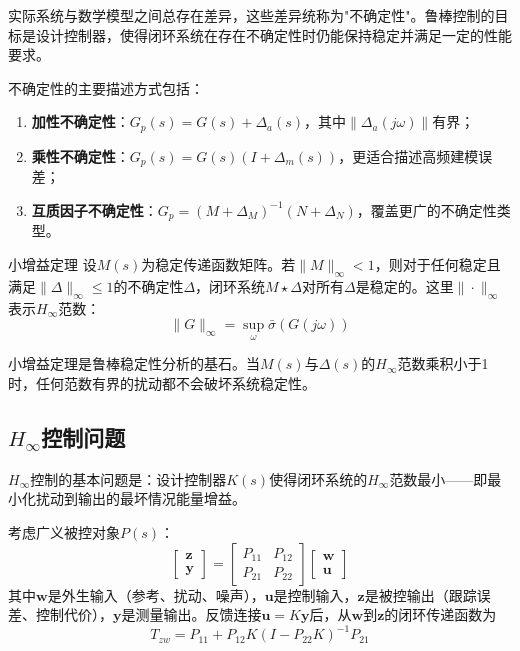 实际系统与数学模型之间总存在差异，这些差异统称为"不确定性"。鲁棒控制的目标是设计控制器，使得闭环系统在存在不确定性时仍能保持稳定并满足一定的性能要求。

不确定性的主要描述方式包括：
\begin{enumerate}
\item \textbf{加性不确定性}：\(G_p(s) = G(s) + \Delta_a(s)\)，其中\(\|\Delta_a(j\omega)\|\)有界；
\item \textbf{乘性不确定性}：\(G_p(s) = G(s)(I + \Delta_m(s))\)，更适合描述高频建模误差；
\item \textbf{互质因子不确定性}：\(G_p = (M + \Delta_M)^{-1}(N + \Delta_N)\)，覆盖更广的不确定性类型。
\end{enumerate}

\begin{mydefinition}{小增益定理}
设\(M(s)\)为稳定传递函数矩阵。若\(\|M\|_{\infty} < 1\)，则对于任何稳定且满足\(\|\Delta\|_{\infty} \le 1\)的不确定性\(\Delta\)，闭环系统\(M \star \Delta\)对所有\(\Delta\)是稳定的。这里\(\|\cdot\|_{\infty}\)表示\(H_{\infty}\)范数：
\[
\|G\|_{\infty} = \sup_{\omega} \bar{\sigma}(G(j\omega))
\]
\end{mydefinition}

小增益定理是鲁棒稳定性分析的基石。当\(M(s)\)与\(\Delta(s)\)的\(H_{\infty}\)范数乘积小于1时，任何范数有界的扰动都不会破坏系统稳定性。

\subsection{\(H_{\infty}\)控制问题}

\(H_{\infty}\)控制的基本问题是：设计控制器\(K(s)\)使得闭环系统的\(H_{\infty}\)范数最小——即最小化扰动到输出的最坏情况能量增益。

考虑广义被控对象\(P(s)\)：
\[
\begin{bmatrix} \mathbf{z} \\ \mathbf{y} \end{bmatrix} =
\begin{bmatrix} P_{11} & P_{12} \\ P_{21} & P_{22} \end{bmatrix}
\begin{bmatrix} \mathbf{w} \\ \mathbf{u} \end{bmatrix}
\]
其中\(\mathbf{w}\)是外生输入（参考、扰动、噪声），\(\mathbf{u}\)是控制输入，\(\mathbf{z}\)是被控输出（跟踪误差、控制代价），\(\mathbf{y}\)是测量输出。反馈连接\(\mathbf{u} = K\mathbf{y}\)后，从\(\mathbf{w}\)到\(\mathbf{z}\)的闭环传递函数为
\[
T_{zw} = P_{11} + P_{12}K(I - P_{22}K)^{-1}P_{21}
\]

